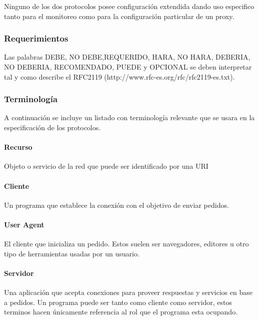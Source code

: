 \documentclass[a4paper,10pt]{article}
\begin{document}
        Ninguno de los dos protocolos posee configuración extendida dando uso especifico tanto para el monitoreo 
        como para la configuración particular de un proxy.

        \subsubsection{Requerimientos}

        Las palabras DEBE, NO DEBE,REQUERIDO, HARA, NO HARA, DEBERIA, NO DEBERIA, 
        RECOMENDADO, PUEDE y OPCIONAL se deben interpretar tal y como describe el 
        RFC2119 (http://www.rfc-es.org/rfc/rfc2119-es.txt).

        \subsubsection{Terminolog\'ia}

        A continuación se incluye un listado con terminolog\'ia relevante que se usara en la 
        especificaci\'on de los protocolos.

            \paragraph*{Recurso}

            Objeto o servicio de la red que puede ser identificado por una URI

            \paragraph*{Cliente}

            Un programa que establece la conexi\'on con el objetivo de enviar pedidos.

            \paragraph*{User Agent}

            El cliente que inicializa un pedido. Estos suelen ser navegadores, editores u otro 
            tipo de herramientas usadas por un usuario.

            \paragraph*{Servidor}

            Una aplicaci\'on que acepta conexiones para proveer respuestas y servicios en base 
            a pedidos. Un programa puede ser tanto como cliente como servidor, estos terminos 
            hacen \'unicamente referencia al rol que el programa esta ocupando.
\end{document}
